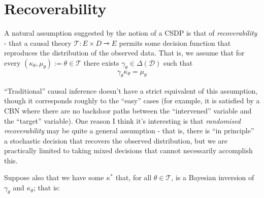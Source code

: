 



\section{Recoverability}

A natural assumption suggested by the notion of a CSDP is that of \emph{recoverability} - that a causal theory $\mathscr{T}:E\times D\rightarrowtriangle E$ permits some decision function that reproduces the distribution of the observed data. That is, we assume that for every $(\kappa_\theta,\mu_\theta):=\theta\in \mathscr{T}$ there exists $\gamma_{\theta}\in \Delta(\mathcal{D})$ such that
\begin{align}
	\gamma_{\theta}\kappa_\theta = \mu_\theta \label{eq:recoverability}
\end{align}

``Traditional'' causal inference doesn't have a strict equivalent of this assumption, though it corresponds roughly to the ``easy'' cases (for example, it is satisfied by a CBN where there are no backdoor paths between the ``intervened'' variable and the ``target'' variable). One reason I think it's interesting is that \emph{randomised recoverability} may be quite a general assumption - that is, there is ``in principle'' a stochastic decision that recovers the observed distribution, but we are practically limited to taking mixed decisions that cannot necessarily accomplish this.

Suppose also that we have some $\kappa^*$ that, for all $\theta \in \mathscr{T}$, is a Bayesian inversion of $\gamma_\theta$ and $\kappa_\theta$; that is:

